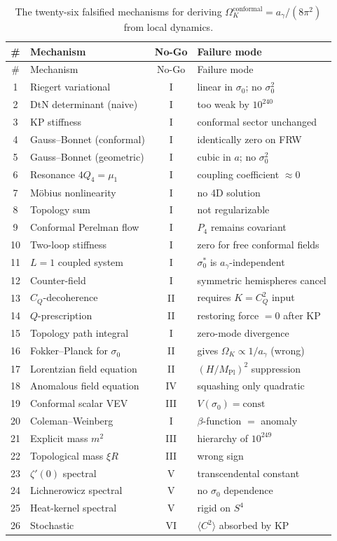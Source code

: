 \documentclass[11pt,a4paper]{article}
\theoremstyle{plain}
\theoremstyle{definition}
\theoremstyle{remark}
\newcommand{\Ok}{\Omega_K}
\newcommand{\ag}{a_\gamma}
\newcommand{\CQ}{C_Q}
\newcommand{\Mpl}{M_{\mathrm{Pl}}}
\newcommand{\avg}[1]{\langle #1 \rangle}
\begin{document}
\begin{longtable}{@{}c p{6.4cm} c p{4.2cm}@{}}
\caption{The twenty-six falsified mechanisms for deriving
$\Ok^{\mathrm{conformal}} = \ag/(8\pi^2)$ from local dynamics.}\label{tab:mechanisms}\\
\toprule
\# & Mechanism & No-Go & Failure mode \\ \midrule \endfirsthead
\toprule \# & Mechanism & No-Go & Failure mode \\ \midrule \endhead
1 & Riegert variational & I & linear in $\sigma_0$; no $\sigma_0^2$ \\
2 & DtN determinant (naive) & I & too weak by $10^{240}$ \\
3 & KP stiffness & I & conformal sector unchanged \\
4 & Gauss--Bonnet (conformal) & I & identically zero on FRW \\
5 & Gauss--Bonnet (geometric) & I & cubic in $a$; no $\sigma_0^2$ \\
6 & Resonance $4Q_4 = \mu_1$ & I & coupling coefficient $\approx 0$ \\
7 & M\"obius nonlinearity & I & no 4D solution \\
8 & Topology sum & I & not regularizable \\
9 & Conformal Perelman flow & I & $P_4$ remains covariant \\
10 & Two-loop stiffness & I & zero for free conformal fields \\
11 & $L=1$ coupled system & I & $\sigma_0^*$ is $\ag$-independent \\
12 & Counter-field & I & symmetric hemispheres cancel \\
13 & $C_Q$-decoherence & II & requires $K = \CQ^2$ input \\
14 & $Q$-prescription & II & restoring force $=0$ after KP \\
15 & Topology path integral & I & zero-mode divergence \\
16 & Fokker--Planck for $\sigma_0$ & II & gives $\Ok \propto 1/\ag$ (wrong) \\
17 & Lorentzian field equation & II & $(H/\Mpl)^2$ suppression \\
18 & Anomalous field equation & IV & squashing only quadratic \\
19 & Conformal scalar VEV & III & $V(\sigma_0) = \text{const}$ \\
20 & Coleman--Weinberg & I & $\beta$-function $=$ anomaly \\
21 & Explicit mass $m^2$ & III & hierarchy of $10^{249}$ \\
22 & Topological mass $\xi R$ & III & wrong sign \\
23 & $\zeta'(0)$ spectral & V & transcendental constant \\
24 & Lichnerowicz spectral & V & no $\sigma_0$ dependence \\
25 & Heat-kernel spectral & V & rigid on $S^4$ \\
26 & Stochastic & VI & $\avg{C^2}$ absorbed by KP \\
\bottomrule
\end{longtable}
\end{document}
